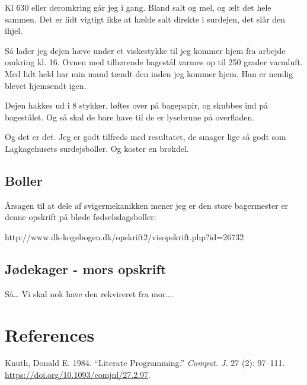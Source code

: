 \documentclass[
  letterpaper,
  DIV=11,
  numbers=noendperiod]{scrreprt}
\newlength{\cslhangindent}
\newlength{\cslentryspacingunit} %
\newenvironment{CSLReferences}[2] %
 {%
  \setlength{\parindent}{0pt}
  \ifodd #1
  \let\oldpar\par
  \def\par{\hangindent=\cslhangindent\oldpar}
  \fi
  \setlength{\parskip}{#2\cslentryspacingunit}
 }%
 {}
\begin{document}
Kl 630 eller deromkring går jeg i gang. Bland salt og mel, og ælt det
hele sammen. Det er lidt vigtigt ikke at hælde salt direkte i surdejen,
det slår den ihjel.

Så lader jeg dejen hæve under et viskestykke til jeg kommer hjem fra
arbejde omkring kl. 16. Ovnen med tilhørende bagestål varmes op til 250
grader varmluft. Med lidt held har min mand tændt den inden jeg kommer
hjem. Han er nemlig blevet hjemsendt igen.

Dejen hakkes ud i 8 stykker, løftes over på bagepapir, og skubbes ind på
bagestålet. Og så skal de bare have til de er lysebrune på overfladen.

Og det er det. Jeg er godt tilfreds med resultatet, de smager lige så
godt som Lagkagehusets surdejsboller. Og koster en brøkdel.

\hypertarget{boller-1}{%
\section{Boller}\label{boller-1}}

Årsagen til at dele af svigermekanikken mener jeg er den store
bagermester er denne opskrift på bløde fødselsdagsboller:

http://www.dk-kogebogen.dk/opskrift2/visopskrift.php?id=26732

\hypertarget{juxf8dekager---mors-opskrift-1}{%
\section{Jødekager - mors
opskrift}\label{juxf8dekager---mors-opskrift-1}}

Så\ldots{} Vi skal nok have den rekvireret fra mor\ldots.


\hypertarget{references}{%
\chapter*{References}\label{references}}


\hypertarget{refs}{}
\begin{CSLReferences}{1}{0}
\leavevmode{}%
Knuth, Donald E. 1984. {``Literate Programming.''} \emph{Comput. J.} 27
(2): 97--111. \url{https://doi.org/10.1093/comjnl/27.2.97}.

\end{CSLReferences}
\end{document}
